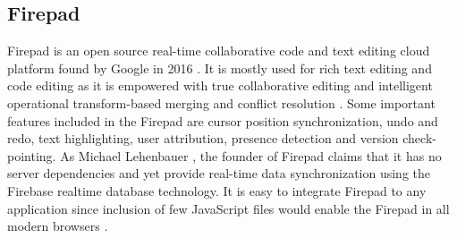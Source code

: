\subsection{Firepad}

Firepad is an open source real-time collaborative code and text editing cloud
platform found by Google in 2016 \cite{hid-sp18-409-www-firepad}.  It is mostly
used for rich text editing and code editing as it is empowered with true
collaborative editing and intelligent operational transform-based merging and
conflict resolution \cite{hid-sp18-409-www-firepad-wikipedia}. Some important
features included in the Firepad are cursor position synchronization, undo and
redo, text highlighting, user attribution, presence detection and version
check-pointing. As Michael Lehenbauer \cite{hid-sp18-409-www-firepad}, the
founder of Firepad claims that it has no server dependencies and yet provide
real-time data synchronization using the Firebase realtime database technology.
It is easy to integrate Firepad to any application since inclusion of few
JavaScript files would enable the Firepad in all modern browsers
\cite{hid-sp18-409-www-firepad}.
